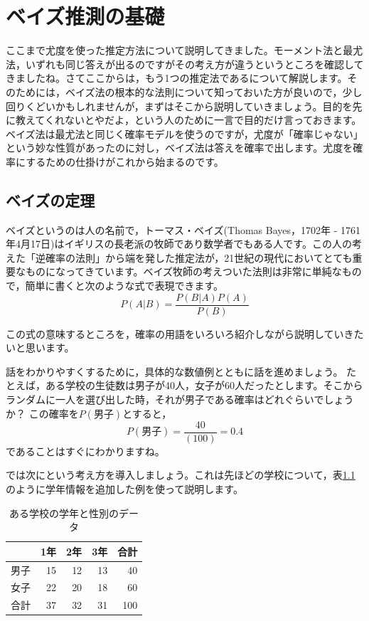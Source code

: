 \documentclass{ltjsbook}
\begin{document}
\chapter{ベイズ推測の基礎}
\label{m25_bayesian}
ここまで尤度を使った推定方法について説明してきました。モーメント法と最尤法，いずれも同じ答えが出るのですがその考え方が違うというところを確認してきましたね。さてここからは，もう1つの推定法であるについて解説します。そのためには，ベイズ法の根本的な法則について知っておいた方が良いので，少し回りくどいかもしれませんが，まずはそこから説明していきましょう。目的を先に教えてくれないとやだよ，という人のために一言で目的だけ言っておきます。ベイズ法は最尤法と同じく確率モデルを使うのですが，尤度が「確率じゃない」という妙な性質があったのに対し，ベイズ法は答えを確率で出します。尤度を確率にするための仕掛けがこれから始まるのです。

\section{ベイズの定理}
ベイズというのは人の名前で，トーマス・ベイズ(Thomas Bayes，1702年 - 1761年4月17日)はイギリスの長老派の牧師であり数学者でもある人です。この人の考えた「逆確率の法則」から端を発した推定法が，21世紀の現代においてとても重要なものになってきています。ベイズ牧師の考えついた法則は非常に単純なもので，簡単に書くと次のような式で表現できます。
\[ P(A|B) = \frac{P(B|A)P(A)}{P(B)} \]

この式の意味するところを，確率の用語をいろいろ紹介しながら説明していきたいと思います。

話をわかりやすくするために，具体的な数値例とともに話を進めましょう。
たとえば，ある学校の生徒数は男子が40人，女子が60人だったとします。そこからランダムに一人を選び出した時，それが男子である確率はどれぐらいでしょうか？ この確率を$P(\mbox{男子})$とすると，
\[P(\mbox{男子})=\frac{40}{(100)}=0.4 \]
であることはすぐにわかりますね。

では次にという考え方を導入しましょう。これは先ほどの学校について，表\ref{tbl::24_02}のように学年情報を追加した例を使って説明します。

\begin{table}[ht]
	\centering
	\caption{ある学校の学年と性別のデータ}
	\begin{tabular}{rrrrr}
		\hline
		   & 1年 & 2年 & 3年 & 合計  \\
		\hline
		男子 & 15 & 12 & 13 & 40  \\
		女子 & 22 & 20 & 18 & 60  \\\hline
		合計 & 37 & 32 & 31 & 100 \\\hline
	\end{tabular}
	\label{tbl::24_02}
\end{table}
\end{document}
